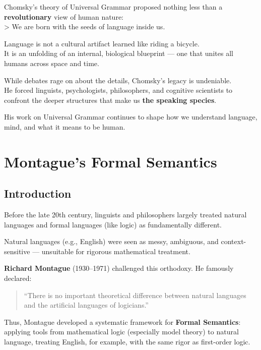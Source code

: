 \documentclass[12pt]{article}
\begin{document}
Chomsky's theory of Universal Grammar proposed nothing less than a
\textbf{revolutionary} view of human nature:\\
\textgreater{} We are born with the seeds of language inside us.

Language is not a cultural artifact learned like riding a bicycle.\\
It is an unfolding of an internal, biological blueprint --- one that
unites all humans across space and time.

While debates rage on about the details, Chomsky's legacy is
undeniable.\\
He forced linguists, psychologists, philosophers, and cognitive
scientists to confront the deeper structures that make us \textbf{the
speaking species}.

His work on Universal Grammar continues to shape how we understand
language, mind, and what it means to be human.

\hypertarget{montagues-formal-semantics}{%
\section{Montague's Formal Semantics}\label{montagues-formal-semantics}}

\hypertarget{introduction-1}{%
\subsection{Introduction}\label{introduction-1}}

Before the late 20th century, linguists and philosophers largely treated
natural languages and formal languages (like logic) as fundamentally
different.

Natural languages (e.g., English) were seen as messy, ambiguous, and
context-sensitive --- unsuitable for rigorous mathematical treatment.

\textbf{Richard Montague} (1930--1971) challenged this orthodoxy. He
famously declared:

\begin{quote}
``There is no important theoretical difference between natural languages
and the artificial languages of logicians.''
\end{quote}

Thus, Montague developed a systematic framework for \textbf{Formal
Semantics}: applying tools from mathematical logic (especially model
theory) to natural language, treating English, for example, with the
same rigor as first-order logic.
\end{document}
